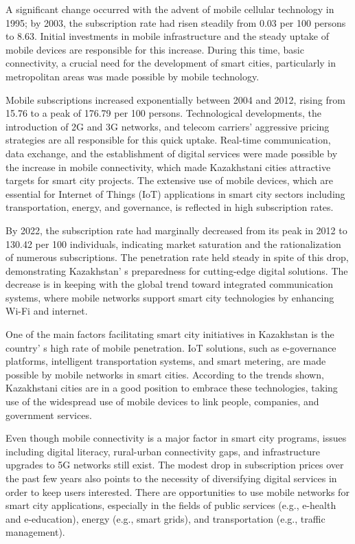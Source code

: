 \begin{multicols}{2}
A significant change occurred with the advent of mobile cellular
technology in 1995; by 2003, the subscription rate had risen steadily
from 0.03 per 100 persons to 8.63. Initial investments in mobile
infrastructure and the steady uptake of mobile devices are responsible
for this increase. During this time, basic connectivity, a crucial need
for the development of smart cities, particularly in metropolitan areas
was made possible by mobile technology.

Mobile subscriptions increased exponentially between 2004 and 2012,
rising from 15.76 to a peak of 176.79 per 100 persons. Technological
developments, the introduction of 2G and 3G networks, and telecom
carriers'{} aggressive pricing strategies are all
responsible for this quick uptake. Real-time communication, data
exchange, and the establishment of digital services were made possible
by the increase in mobile connectivity, which made Kazakhstani cities
attractive targets for smart city projects. The extensive use of mobile
devices, which are essential for Internet of Things (IoT) applications
in smart city sectors including transportation, energy, and governance,
is reflected in high subscription rates.

By 2022, the subscription rate had marginally decreased from its peak in
2012 to 130.42 per 100 individuals, indicating market saturation and the
rationalization of numerous subscriptions. The penetration rate held
steady in spite of this drop, demonstrating Kazakhstan' s
preparedness for cutting-edge digital solutions. The decrease is in
keeping with the global trend toward integrated communication systems,
where mobile networks support smart city technologies by enhancing Wi-Fi
and internet.

One of the main factors facilitating smart city initiatives in
Kazakhstan is the country' s high rate of mobile
penetration. IoT solutions, such as e-governance platforms, intelligent
transportation systems, and smart metering, are made possible by mobile
networks in smart cities. According to the trends shown, Kazakhstani
cities are in a good position to embrace these technologies, taking use
of the widespread use of mobile devices to link people, companies, and
government services.

Even though mobile connectivity is a major factor in smart city
programs, issues including digital literacy, rural-urban connectivity
gaps, and infrastructure upgrades to 5G networks still exist. The modest
drop in subscription prices over the past few years also points to the
necessity of diversifying digital services in order to keep users
interested. There are opportunities to use mobile networks for smart
city applications, especially in the fields of public services (e.g.,
e-health and e-education), energy (e.g., smart grids), and
transportation (e.g., traffic management).


\end{multicols}
